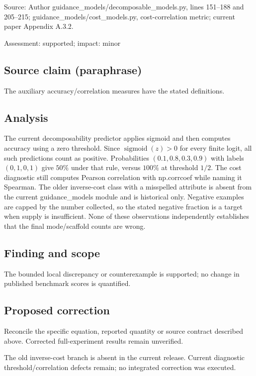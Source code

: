 \documentclass[11pt]{article}
\begin{document}
Source: Author guidance\_models/decomposable\_models.py, lines 151–188 and 205–215; guidance\_models/cost\_models.py, cost-correlation metric; current paper Appendix A.3.2.

Assessment: supported; impact: minor

\subsection*{Source claim (paraphrase)}

The auxiliary accuracy/correlation measures have the stated definitions.

\subsection*{Analysis}

The current decomposability predictor applies sigmoid and then computes accuracy using a zero threshold. Since \(\operatorname{sigmoid}(z)>0\) for every finite logit, all such predictions count as positive. Probabilities \((0.1,0.8,0.3,0.9)\) with labels \((0,1,0,1)\) give \(50\%\) under that rule, versus \(100\%\) at threshold \(1/2\). The cost diagnostic still computes Pearson correlation with np.corrcoef while naming it Spearman. The older inverse-cost class with a misspelled attribute is absent from the current guidance\_models module and is historical only. Negative examples are capped by the number collected, so the stated negative fraction is a target when supply is insufficient. None of these observations independently establishes that the final mode/scaffold counts are wrong.

\subsection*{Finding and scope}

The bounded local discrepancy or counterexample is supported; no change in published benchmark scores is quantified.

\subsection*{Proposed correction}

Reconcile the specific equation, reported quantity or source contract described above. Corrected full-experiment results remain unverified.

The old inverse-cost branch is absent in the current release. Current diagnostic threshold/correlation defects remain; no integrated correction was executed.
\end{document}
